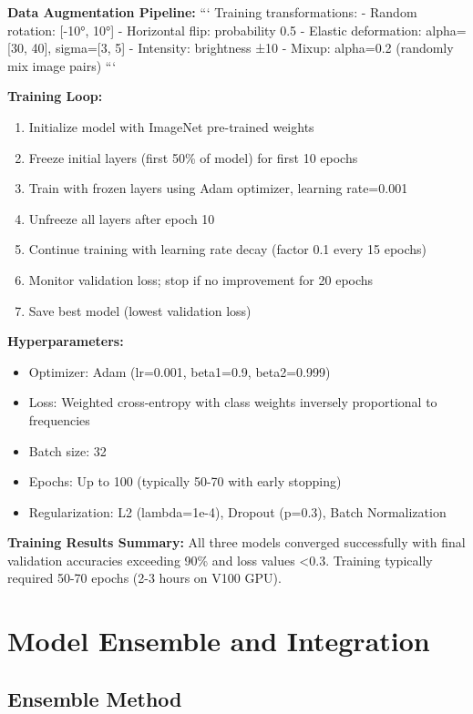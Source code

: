 {\textbf{Data Augmentation Pipeline:}
```
Training transformations:
- Random rotation: [-10°, 10°]
- Horizontal flip: probability 0.5
- Elastic deformation: alpha=[30, 40], sigma=[3, 5]
- Intensity: brightness ±10%
- Mixup: alpha=0.2 (randomly mix image pairs)
```

\textbf{Training Loop:}
\begin{enumerate}
    \item Initialize model with ImageNet pre-trained weights
    \item Freeze initial layers (first 50\% of model) for first 10 epochs
    \item Train with frozen layers using Adam optimizer, learning rate=0.001
    \item Unfreeze all layers after epoch 10
    \item Continue training with learning rate decay (factor 0.1 every 15 epochs)
    \item Monitor validation loss; stop if no improvement for 20 epochs
    \item Save best model (lowest validation loss)
\end{enumerate}

\textbf{Hyperparameters:}
\begin{itemize}
    \item Optimizer: Adam (lr=0.001, beta1=0.9, beta2=0.999)
    \item Loss: Weighted cross-entropy with class weights inversely proportional to frequencies
    \item Batch size: 32
    \item Epochs: Up to 100 (typically 50-70 with early stopping)
    \item Regularization: L2 (lambda=1e-4), Dropout (p=0.3), Batch Normalization
\end{itemize}

\textbf{Training Results Summary:}
All three models converged successfully with final validation accuracies exceeding 90\% and loss values \textless 0.3. Training typically required 50-70 epochs (2-3 hours on V100 GPU).

\section{Model Ensemble and Integration}

\subsection{Ensemble Method}

}
